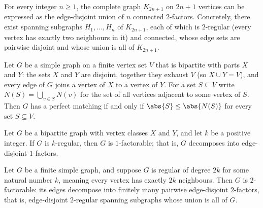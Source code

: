 \begin{theorem}
\label{SimpleGraph.completeGraph_odd_two_factorable}
For every integer $n \ge 1$, the complete graph $K_{2n+1}$ on $2n+1$ vertices can be
expressed as the edge-disjoint union of $n$ connected $2$-factors. Concretely, there
exist spanning subgraphs $H_1, \ldots, H_n$ of $K_{2n+1}$, each of which is $2$-regular
(every vertex has exactly two neighbours in it) and connected, whose edge sets are
pairwise disjoint and whose union is all of $K_{2n+1}$.
\end{theorem}

\begin{theorem}
\label{SimpleGraph.bipartite_perfectMatching_iff}
Let $G$ be a simple graph on a finite vertex set $V$ that is bipartite with parts $X$
and $Y$: the sets $X$ and $Y$ are disjoint, together they exhaust $V$ (so $X \cup Y =
V$), and every edge of $G$ joins a vertex of $X$ to a vertex of $Y$. For a set $S
\subseteq V$ write $N(S) = \bigcup_{v \in S} N(v)$ for the set of all vertices adjacent
to some vertex of $S$. Then $G$ has a perfect matching if and only if $\abs{S} \le
\abs{N(S)}$ for every set $S \subseteq V$.
\end{theorem}

\begin{theorem}
\label{SimpleGraph.regular_bipartite_one_factorable}
Let $G$ be a bipartite graph with vertex classes $X$ and $Y$, and let $k$ be a positive
integer. If $G$ is $k$-regular, then $G$ is $1$-factorable; that is, $G$ decomposes into
edge-disjoint $1$-factors.
\end{theorem}

\begin{theorem}
\label{SimpleGraph.regular_two_factorable}
Let $G$ be a finite simple graph, and suppose $G$ is regular of degree $2k$ for some
natural number $k$, meaning every vertex has exactly $2k$ neighbours. Then $G$ is
$2$-factorable: its edges decompose into finitely many pairwise edge-disjoint
$2$-factors, that is, edge-disjoint $2$-regular spanning subgraphs whose union is all of
$G$.
\end{theorem}

